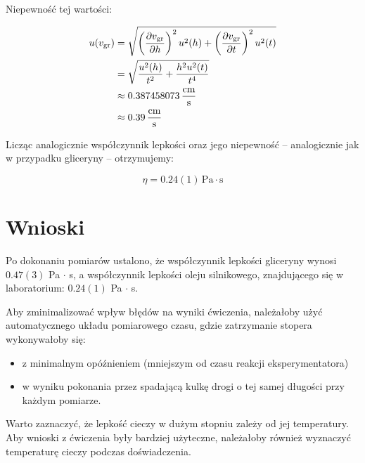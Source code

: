 \documentclass[a4paper]{article}
\newlength{\du}
\begin{document}
Niepewność tej wartości:

\begin{align*}
	u(v_{\text{gr}}) &= \sqrt{\left(\frac{\partial v_{\text{gr}}}{\partial h}\right)^2 u^2(h) + \left(\frac{\partial v_{\text{gr}}}{\partial t}\right)^2 u^2(t)} \\
	&= \sqrt{\frac{u^2(h)}{t^2} + \frac{h^2 u^2(t)}{t^4}} \\
	&\approx 0.387458073 \, \frac{\text{cm}}{\text{s}} \\
	&\approx 0.39 \, \frac{\text{cm}}{\text{s}}
\end{align*}

Licząc analogicznie współczynnik lepkości oraz jego niepewność -- analogicznie jak w przypadku gliceryny -- otrzymujemy:

$$
\eta = 0.24 (1) \, \text{Pa} \cdot \text{s}
$$

\section{Wnioski}

Po dokonaniu pomiarów ustalono, że współczynnik lepkości gliceryny wynosi $0.47(3)$ Pa $\cdot$ s,
a współczynnik lepkości oleju silnikowego, znajdującego się w laboratorium: $0.24(1)$ Pa $\cdot$ s.

Aby zminimalizować wpływ błędów na wyniki ćwiczenia, należałoby użyć automatycznego układu
pomiarowego czasu, gdzie zatrzymanie stopera wykonywałoby się:
\begin{itemize}
\item z minimalnym opóźnieniem (mniejszym od czasu reakcji eksperymentatora)
\item w wyniku pokonania przez spadającą kulkę drogi o tej samej długości przy każdym pomiarze.
\end{itemize}

Warto zaznaczyć, że lepkość cieczy w dużym stopniu zależy od jej temperatury.
Aby wnioski z ćwiczenia były bardziej użyteczne, należałoby również wyznaczyć temperaturę cieczy
podczas doświadczenia.
\end{document}
